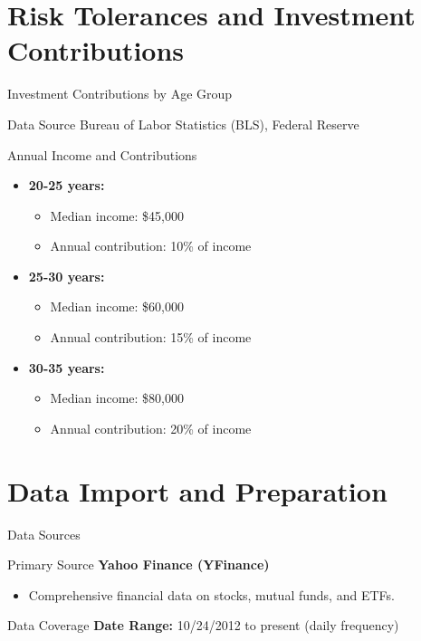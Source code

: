 \documentclass{beamer}
\begin{document}
\section{Risk Tolerances and Investment Contributions}
\begin{frame}{Investment Contributions by Age Group}
    \begin{block}{Data Source}
        Bureau of Labor Statistics (BLS), Federal Reserve
    \end{block}
    \begin{block}{Annual Income and Contributions}
        \begin{itemize}
            \item \textbf{20-25 years:} 
            \begin{itemize}
                \item Median income: \$45,000
                \item Annual contribution: 10\% of income
            \end{itemize}
            \item \textbf{25-30 years:} 
            \begin{itemize}
                \item Median income: \$60,000
                \item Annual contribution: 15\% of income
            \end{itemize}
            \item \textbf{30-35 years:} 
            \begin{itemize}
                \item Median income: \$80,000
                \item Annual contribution: 20\% of income
            \end{itemize}
        \end{itemize}
    \end{block}
\end{frame}

\section{Data Import and Preparation}
\begin{frame}{Data Sources}
    \begin{block}{Primary Source}
        \textbf{Yahoo Finance (YFinance)}
        \begin{itemize}
            \item Comprehensive financial data on stocks, mutual funds, and ETFs.
        \end{itemize}
    \end{block}
    \begin{block}{Data Coverage}
        \textbf{Date Range:} 10/24/2012 to present (daily frequency)
    \end{block}
\end{frame}
\end{document}
